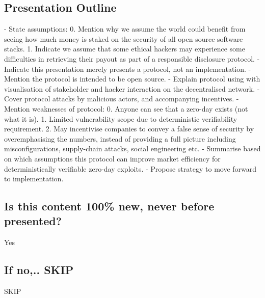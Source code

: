 \documentclass{article}
\begin{document}
\subsection{Presentation Outline}
- State assumptions: 
0. Mention why we assume the world could benefit from seeing how much money is staked on the security of all open source software stacks. 
1. Indicate we assume that some ethical hackers may experience some difficulties in retrieving their payout as part of a responsible disclosure protocol.
- Indicate this presentation merely presents a protocol, not an implementation.
- Mention the protocol is intended to be open source.
- Explain protocol using with visualisation of stakeholder and hacker interaction on the decentralised network.
- Cover protocol attacks by malicious actors, and accompanying incentives.
- Mention weaknesses of protocol: 
0. Anyone can see that a zero-day exists (not what it is). 
1. Limited vulnerability scope due to deterministic verifiability requirement. 
2. May incentivise companies to convey a false sense of security by overemphasising the numbers, instead of providing a full picture including misconfigurations, supply-chain attacks, social engineering etc.
- Summarise based on which assumptions this protocol can improve market efficiency for deterministically verifiable zero-day exploits. 
- Propose strategy to move forward to implementation.
\subsection{Is this content 100\% new, never before presented?}
Yes
\subsection{If no,.. SKIP}
SKIP
\end{document}
